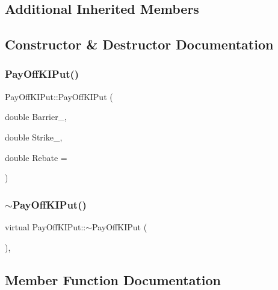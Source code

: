 \subsection*{Additional Inherited Members}


\subsection{Constructor \& Destructor Documentation}
\hypertarget{classPayOffKIPut_a950d8affcaf671b3e9c252b2fa065009}{}\label{classPayOffKIPut_a950d8affcaf671b3e9c252b2fa065009} 
\subsubsection{\texorpdfstring{Pay\+Off\+K\+I\+Put()}{PayOffKIPut()}}
{\footnotesize\ttfamily Pay\+Off\+K\+I\+Put\+::\+Pay\+Off\+K\+I\+Put (\begin{DoxyParamCaption}\item[{double}]{Barrier\+\_\+,  }\item[{double}]{Strike\+\_\+,  }\item[{double}]{Rebate = {} }\end{DoxyParamCaption})}

\hypertarget{classPayOffKIPut_ab054b919f93b3e5d82fe96f9a229e08d}{}\label{classPayOffKIPut_ab054b919f93b3e5d82fe96f9a229e08d} 
\subsubsection{\texorpdfstring{$\sim$\+Pay\+Off\+K\+I\+Put()}{~PayOffKIPut()}}
{\footnotesize\ttfamily virtual Pay\+Off\+K\+I\+Put\+::$\sim$\+Pay\+Off\+K\+I\+Put (\begin{DoxyParamCaption}{ }\end{DoxyParamCaption})\hspace{0.3cm}{\ttfamily [inline]}, {\ttfamily [virtual]}}



\subsection{Member Function Documentation}
\hypertarget{classPayOffKIPut_ae6a387c91133eedbe19600bb7b455a48}{}\label{classPayOffKIPut_ae6a387c91133eedbe19600bb7b455a48} 
